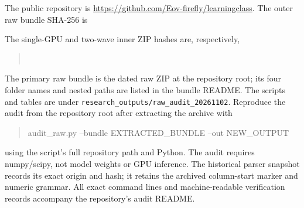 \documentclass[12pt,a4paper]{article}
\newcommand{\code}[1]{\texttt{#1}}
\begin{document}
The public repository is \url{https://github.com/Eov-firefly/learningclass}. The outer raw bundle SHA-256 is
\begin{quote}\small\ttfamily\raggedright
{}
\end{quote}
The single-GPU and two-wave inner ZIP hashes are, respectively,
\begin{quote}\small\ttfamily\raggedright
{}\\
\end{quote}
The primary raw bundle is the dated raw ZIP at the repository root; its four folder names and nested paths are listed in the bundle README. The scripts and tables are under \code{research\_outputs/raw\_audit\_20261102}. Reproduce the audit from the repository root after extracting the archive with
\begin{quote}\small\ttfamily\raggedright
audit\_raw.py --bundle EXTRACTED\_BUNDLE --out NEW\_OUTPUT
\end{quote}
using the script's full repository path and Python. The audit requires numpy/scipy, not model weights or GPU inference. The historical parser snapshot records its exact origin and hash; it retains the archived column-start marker and numeric grammar. All exact command lines and machine-readable verification records accompany the repository's audit README.


\end{document}
